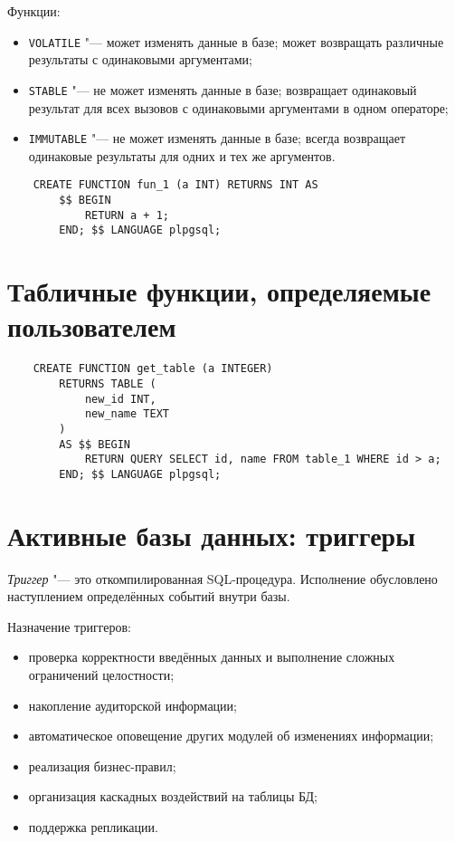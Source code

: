 Функции:
\begin{itemize}
	\item \texttt{VOLATILE} "--- может изменять данные в базе; может возвращать различные результаты с одинаковыми аргументами;
	\item \texttt{STABLE} "--- не может изменять данные в базе; возвращает одинаковый результат для всех вызовов с одинаковыми аргументами в одном операторе;
	\item \texttt{IMMUTABLE} "--- не может изменять данные в базе; всегда возвращает одинаковые результаты для одних и тех же аргументов.
\end{itemize}

\begin{verbatim}
	CREATE FUNCTION fun_1 (a INT) RETURNS INT AS
		$$ BEGIN
			RETURN a + 1;
		END; $$ LANGUAGE plpgsql;
\end{verbatim}

\section{Табличные функции, определяемые пользователем}

\begin{verbatim}
	CREATE FUNCTION get_table (a INTEGER)
		RETURNS TABLE (
			new_id INT,
			new_name TEXT
		)
		AS $$ BEGIN
			RETURN QUERY SELECT id, name FROM table_1 WHERE id > a;
		END; $$ LANGUAGE plpgsql;
\end{verbatim}

\section{Активные базы данных: триггеры}

\begin{definition}
	\emph{Триггер} "--- это откомпилированная SQL-процедура.
	Исполнение обусловлено наступлением определённых событий внутри базы.
\end{definition}

Назначение триггеров:
\begin{itemize}
	\item проверка корректности введённых данных и выполнение сложных ограничений целостности;
	\item накопление аудиторской информации;
	\item автоматическое оповещение других модулей об изменениях информации;
	\item реализация бизнес-правил;
	\item организация каскадных воздействий на таблицы БД;
	\item поддержка репликации.
\end{itemize}

